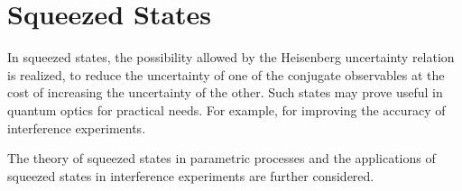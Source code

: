 \chapter{Squeezed States}
\label{chSqueezed}
In squeezed states, the possibility allowed by the Heisenberg uncertainty relation is realized, to reduce the uncertainty of one of the conjugate observables at the cost of increasing the uncertainty of the other. Such states may prove useful in quantum optics for practical needs. For example, for improving the accuracy of interference experiments.

The theory of squeezed states in parametric processes and the applications of squeezed states in interference experiments are further considered.









